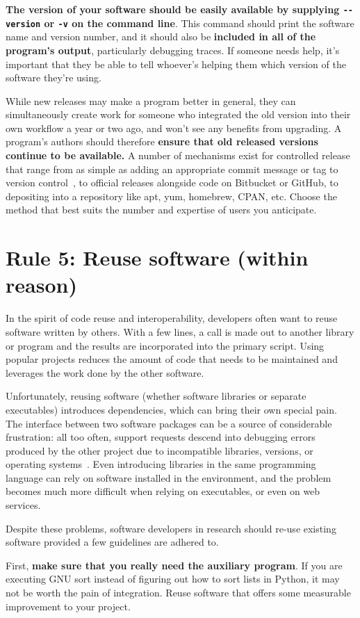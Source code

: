 \documentclass[10pt,letterpaper]{article}
\newcommand{\rulemajor}[1]{\section{#1}}
\newcommand{\ruleminor}[1]{\textbf{#1}}
\newcommand{\reviewed}[1]{{\color{black}#1}}
\begin{document}
\ruleminor{The version of your software should be easily available by
supplying \texttt{-\/-version} or \texttt{-v} on the command line}. This command should print
the software name and version number, and it should
also be \ruleminor{included in all of the program's output}, particularly debugging
traces.  If someone needs help, it's important that they be able to tell
whoever's helping them which version of the software they're using.

While new releases may make a program better in general,
they can simultaneously create work for someone
who integrated the old version into their own workflow a year or two ago,
and won't see any benefits from upgrading.
A program's authors should therefore \ruleminor{ensure that old released versions
continue to be available.}
A number of mechanisms exist for
controlled release that range from as simple as adding an appropriate
commit message or tag to version control~\cite{blischak2016}, to official releases alongside
code on Bitbucket or GitHub, to depositing into a
repository like apt, yum, homebrew, CPAN, etc. Choose the method that
best suits the number and expertise of users you anticipate.

\rulemajor{Rule 5: Reuse software (within reason)}

In the spirit of code reuse and interoperability, developers often want
to reuse software written by others.
With a few lines, a call
is made out to \reviewed{another library or program} and the results are incorporated into the
primary script. Using popular projects reduces the amount of code that
needs to be maintained and leverages the work done by the other software.

Unfortunately, reusing software \reviewed{(whether software libraries or separate executables)}
introduces dependencies, which can
bring their own special pain. The interface between two software
packages can be a source of considerable frustration: all too
often, support requests descend into debugging errors produced by the
other project 
\reviewed{due to incompatible libraries, versions, or operating
systems~\cite{brown2013}. Even introducing libraries in the same programming
language can rely on software installed in the environment, and the problem
becomes much more difficult when relying on executables, or even on web
services.}

Despite these problems, software developers in research should
re-use existing software provided a few guidelines are adhered to.

First,
\ruleminor{make sure that you really need the auxiliary program}. If you are
executing GNU sort instead of figuring out how to sort lists in Python,
it may not be worth the pain of integration. \reviewed{Reuse software that offers some
measurable improvement to your project.}
\end{document}
